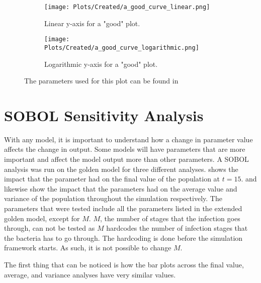 \begin{figure}[h!]
    \centering
    \begin{subfigure}{1\linewidth}
        \centering
        \captionsetup{width=1\linewidth}
        \texttt{[image: Plots/Created/a\_good\_curve\_linear.png]}
        \caption{
            Linear y-axis for a "good" plot. 
        }
        \label{fig:created:a_good_curve_linear}
    \end{subfigure}
    \hfill
    \begin{subfigure}{1\linewidth}
        \centering
        \captionsetup{width=1\linewidth}
        \texttt{[image: Plots/Created/a\_good\_curve\_logarithmic.png]}
        \caption{
            Logarithmic y-axis for a "good" plot. 
        }
        \label{fig:created:a_good_curve_logarithmic}
    \end{subfigure}
    \label{fig:created:a_good_curve}
    \caption{The parameters used for this plot can be found in }
\end{figure}



\section{SOBOL Sensitivity Analysis}
With any model, it is important to understand how a change in parameter value affects the change in output. 
Some models will have parameters that are more important and affect the model output more than other parameters. 
A SOBOL analysis was run on the golden model for three different analyses. 
 shows the impact that the parameter had on the final value of the population at $t=15$. 
 and  likewise show the impact that the parameters had on the average value and variance of the population throughout the simulation respectively. 
The parameters that were tested include all the parameters listed in the extended golden model, except for $M$. 
$M$, the number of stages that the infection goes through, can not be tested as $M$ hardcodes the number of infection stages that the bacteria has to go through. 
The hardcoding is done before the simulation framework starts. As such, it is not possible to change $M$. 

The first thing that can be noticed is how the bar plots across the final value, average, and variance analyses have very similar values. 

